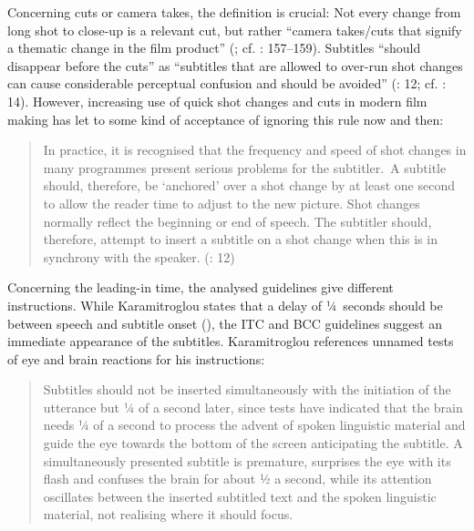 Concerning cuts or camera takes, the definition is crucial: Not every change from long shot to close-up is a relevant cut, but rather “camera takes/cuts that signify a thematic change in the film product” (\citealt{Karamitroglou1998}; cf. \citealt{Ivarsson1998}: 157--159). Subtitles “should disappear before the cuts” \citep{Karamitroglou1998} as “subtitles that are allowed to over-run shot changes can cause considerable perceptual confusion and should be avoided” (\citealt{Itc1999}: 12; cf. \citealt{Ford_williams2009}: 14). However, increasing use of quick shot changes and cuts in modern film making has let to some kind of acceptance of ignoring this rule now and then:

\begin{quote}
In practice, it is recognised that the frequency and speed of shot changes in many programmes present serious problems for the subtitler.~A subtitle should, therefore, be ‘anchored’ over a shot change by at least one second to allow the reader time to adjust to the new picture. Shot changes normally reflect the beginning or end of speech. The subtitler should, therefore, attempt to insert a subtitle on a shot change when this is in synchrony with the speaker. (\citealt{Itc1999}: 12)
\end{quote}

Concerning the leading-in time, the analysed guidelines give different instructions. While Karamitroglou states that a delay of ¼~seconds should be between speech and subtitle onset (\citeyear{Karamitroglou1998}), the ITC and BCC guidelines suggest an immediate appearance of the subtitles. Karamitroglou references unnamed tests of eye and brain reactions for his instructions:

\begin{quote}
Subtitles should not be inserted simultaneously with the initiation of the utterance but ¼ of a second later, since tests have indicated that the brain needs ¼ of a second to process the advent of spoken linguistic material and guide the eye towards the bottom of the screen anticipating the subtitle. A simultaneously presented subtitle is premature, surprises the eye with its flash and confuses the brain for about ½ a second, while its attention oscillates between the inserted subtitled text and the spoken linguistic material, not realising where it should focus. \citep{Karamitroglou1998}
\end{quote}

